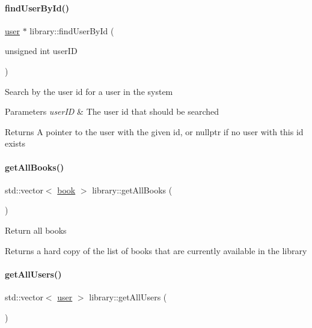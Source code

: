 \paragraph{\texorpdfstring{find\+User\+By\+Id()}{findUserById()}}
{\footnotesize\ttfamily \hyperlink{classuser}{user} $\ast$ library\+::find\+User\+By\+Id (\begin{DoxyParamCaption}\item[{unsigned int}]{user\+ID }\end{DoxyParamCaption})}

Search by the user id for a user in the system


\begin{DoxyParams}{Parameters}
{\em user\+ID} & The user id that should be searched \\
\hline
\end{DoxyParams}
\begin{DoxyReturn}{Returns}
A pointer to the user with the given id, or nullptr if no user with this id exists 
\end{DoxyReturn}
\mbox{\label{classlibrary_a923bf0a858616abc8fb3f536a4d69cf6}} 
\paragraph{\texorpdfstring{get\+All\+Books()}{getAllBooks()}}
{\footnotesize\ttfamily std\+::vector$<$ \hyperlink{classbook}{book} $>$ library\+::get\+All\+Books (\begin{DoxyParamCaption}{ }\end{DoxyParamCaption})}

Return all books

\begin{DoxyReturn}{Returns}
a hard copy of the list of books that are currently available in the library 
\end{DoxyReturn}
\mbox{\label{classlibrary_aa128a867b3ac05e2801d7c3dd5691038}} 
\paragraph{\texorpdfstring{get\+All\+Users()}{getAllUsers()}}
{\footnotesize\ttfamily std\+::vector$<$ \hyperlink{classuser}{user} $>$ library\+::get\+All\+Users (\begin{DoxyParamCaption}{ }\end{DoxyParamCaption})}


